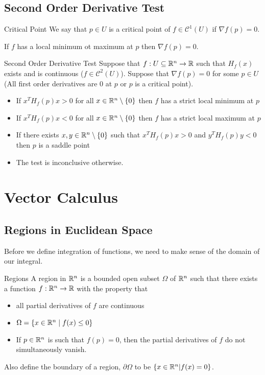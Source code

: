 \documentclass[a4paper]{article}
\begin{document}
\subsection{Second Order Derivative Test}
\begin{defn}{Critical Point}{} We say that $p\in U$ is a critical point of $f\in\mathcal{C}^1(U)$ if $\nabla f(p)=0$. 
\end{defn}

\begin{prp}{}{} If $f$ has a local minimum ot maximum at $p$ then $\nabla f(p)=0$. 
\end{prp}

\begin{thm}{Second Order Derivative Test}{} Suppose that $f:U\subseteq\mathbb{R}^n\to\mathbb{R}$ such that $H_f(x)$ exists and is continuous ($f\in\mathcal{C}^2(U)$). Suppose that $\nabla f(p)=0$ for some $p\in U$ (All first order derivatives are $0$ at $p$ or $p$ is a critical point). 
\begin{itemize}
\item If $x^TH_f(p)x>0$ for all $x\in\mathbb{R}^n\setminus\{0\}$ then $f$ has a strict local minimum at $p$
\item If $x^TH_f(p)x<0$ for all $x\in\mathbb{R}^n\setminus\{0\}$ then $f$ has a strict local maximum at $p$
\item If there exists $x,y\in\mathbb{R}^n\setminus\{0\}$ such that $x^TH_f(p)x>0$ and $y^TH_f(p)y<0$ then $p$ is a saddle point
\item The test is inconclusive otherwise. 
\end{itemize}
\end{thm}

\pagebreak
\section{Vector Calculus}
\subsection{Regions in Euclidean Space}
Before we define integration of functions, we need to make sense of the domain of our integral. 

\begin{defn}{Regions}{} A region in $\mathbb{R}^n$ is a bounded open subset $\Omega$ of $\mathbb{R}^n$ such that there exists a function $f:\mathbb{R}^n\to\mathbb{R}$ with the property that 
\begin{itemize}
\item all partial derivatives of $f$ are continuous
\item $\Omega=\{x\in\mathbb{R}^n\;|\;f(x)\leq 0\}$
\item If $p\in\mathbb{R}^n$ is such that $f(p)=0$, then the partial derivatives of $f$ do not simultaneously vanish. 
\end{itemize}
Also define the boundary of a region, $\partial\Omega$ to be $\{x\in\mathbb{R}^n|f(x)=0\}$. 
\end{defn}
\end{document}
